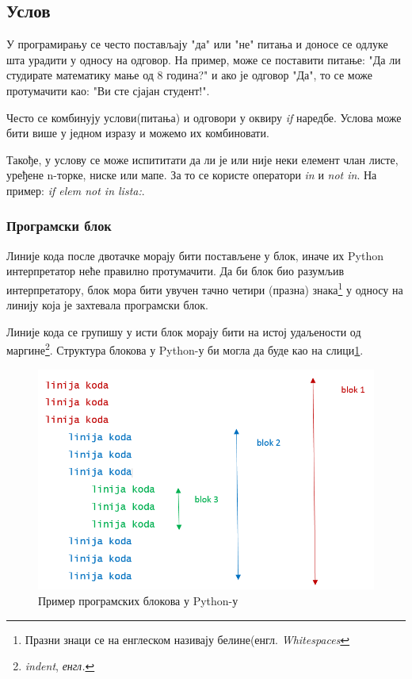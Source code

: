 \subsection{Услов}
У програмирању се често постављају "да" или "не" питања и доносе се одлуке шта урадити у односу на одговор. На пример, може се поставити питање: "Да ли студирате математику мање од 8 година?" и ако је одговор "Да", то се може протумачити као: "Ви сте сјајан студент!".

Често се комбинују услови(питања) и одговори у оквиру \emph{if} наредбе. Услова може бити више у једном изразу и можемо их комбиновати.

Такође, у услову се може испититати да ли је или није неки елемент члан листе, уређене n-торке, ниске или мапе.  За то се користе оператори \emph{in} и \emph{not in}. На пример: \emph{if elem not in lista:}.

\subsubsection{Програмски блок}
Линије кода после двотачке морају бити постављене у блок, иначе их Python интерпретатор неће правилно протумачити. Да би блок био разумљив интерпретатору, блок мора бити увучен тачно четири (празна) знака\footnote{Празни знаци се на енглеском називају белине(енгл. \emph{Whitespaces}}  у односу на линију која је захтевала програмски блок\cite{PEP}.

Линије кода се групишу у исти блок морају бити на истој удаљености од маргине\footnote{\emph{indent}, \emph{енгл.}}. Структура блокова у Python-у би могла да буде као на слици\ref{slike:whitespace}.

\begin{figure}[here]
\centering
\includegraphics[scale=0.5]{whitespace.png}
\caption{Пример програмских блокова у Python-у}
\label{slike:whitespace}
\end{figure}

